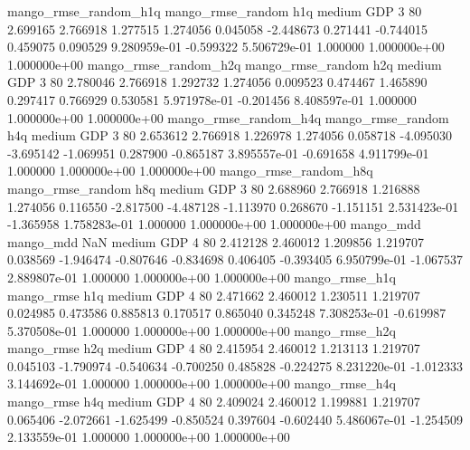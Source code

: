 mango_rmse_random_h1q mango_rmse_random                  h1q     medium      GDP                 3 80  2.699165       2.766918 1.277515       1.274056    0.045058     -2.448673      0.271441    -0.744015       0.459075  0.090529 9.280959e-01    -0.599322   5.506729e-01            1.000000    1.000000e+00        1.000000e+00
mango_rmse_random_h2q mango_rmse_random                  h2q     medium      GDP                 3 80  2.780046       2.766918 1.292732       1.274056    0.009523      0.474467      1.465890     0.297417       0.766929  0.530581 5.971978e-01    -0.201456   8.408597e-01            1.000000    1.000000e+00        1.000000e+00
mango_rmse_random_h4q mango_rmse_random                  h4q     medium      GDP                 3 80  2.653612       2.766918 1.226978       1.274056    0.058718     -4.095030     -3.695142    -1.069951       0.287900 -0.865187 3.895557e-01    -0.691658   4.911799e-01            1.000000    1.000000e+00        1.000000e+00
mango_rmse_random_h8q mango_rmse_random                  h8q     medium      GDP                 3 80  2.688960       2.766918 1.216888       1.274056    0.116550     -2.817500     -4.487128    -1.113970       0.268670 -1.151151 2.531423e-01    -1.365958   1.758283e-01            1.000000    1.000000e+00        1.000000e+00
            mango_mdd         mango_mdd                  NaN     medium      GDP                 4 80  2.412128       2.460012 1.209856       1.219707    0.038569     -1.946474     -0.807646    -0.834698       0.406405 -0.393405 6.950799e-01    -1.067537   2.889807e-01            1.000000    1.000000e+00        1.000000e+00
       mango_rmse_h1q        mango_rmse                  h1q     medium      GDP                 4 80  2.471662       2.460012 1.230511       1.219707    0.024985      0.473586      0.885813     0.170517       0.865040  0.345248 7.308253e-01    -0.619987   5.370508e-01            1.000000    1.000000e+00        1.000000e+00
       mango_rmse_h2q        mango_rmse                  h2q     medium      GDP                 4 80  2.415954       2.460012 1.213113       1.219707    0.045103     -1.790974     -0.540634    -0.700250       0.485828 -0.224275 8.231220e-01    -1.012333   3.144692e-01            1.000000    1.000000e+00        1.000000e+00
       mango_rmse_h4q        mango_rmse                  h4q     medium      GDP                 4 80  2.409024       2.460012 1.199881       1.219707    0.065406     -2.072661     -1.625499    -0.850524       0.397604 -0.602440 5.486067e-01    -1.254509   2.133559e-01            1.000000    1.000000e+00        1.000000e+00
